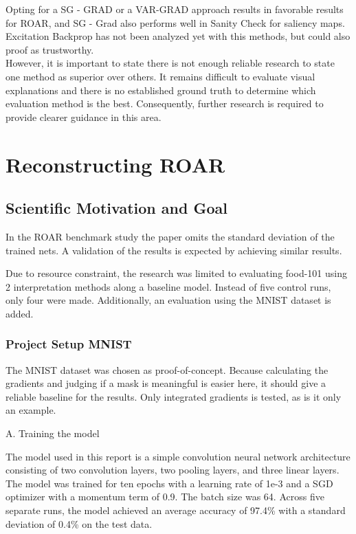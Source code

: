 Opting for  a SG - GRAD or a VAR-GRAD approach results in favorable results for ROAR, and  SG - Grad also performs well in Sanity Check for saliency maps. Excitation Backprop has not been analyzed yet with this methods, but could also proof as trustworthy. \\
However, it is important to state there is not enough reliable research to state one method as superior over others. It remains difficult to evaluate visual explanations and there is no established ground truth to determine which evaluation method is the best. Consequently, further research is required to provide clearer guidance in this area.


\chapter{Reconstructing ROAR} %
\label{sec:project}


\section{Scientific Motivation and Goal}
In the ROAR benchmark study \cite{hooker2019benchmark} the paper omits the standard deviation of the trained nets. A validation of the results is expected by achieving similar results.

Due to resource constraint, the research was limited to evaluating food-101 \cite{bossard14} using 2 interpretation methods along a baseline model. Instead of five control runs, only four were made. Additionally, an evaluation using the MNIST dataset is added.

\subsection{Project Setup MNIST}


The MNIST dataset \cite{deng2012mnist} was chosen as proof-of-concept. Because calculating the gradients and judging if a mask is meaningful is easier here, it should give a reliable baseline for the results. Only integrated gradients is tested, as is it only an example.

A. Training the model

The model used in this report is a simple convolution neural network architecture consisting of two convolution layers, two pooling layers, and three linear layers. The model was trained for ten epochs with a learning rate of 1e-3 and a SGD optimizer with a momentum term of 0.9. The batch size was 64. Across five separate runs, the model achieved an average accuracy of 97.4\% with a standard deviation of 0.4\% on the test data.

